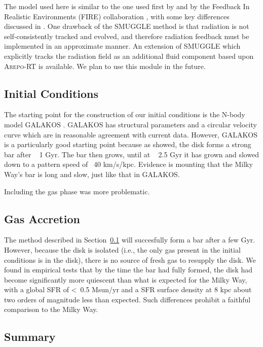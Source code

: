 \documentclass[a4paper,fleqn,usenatbib]{mnras}
\newcommand{\areport}{\textsc{Arepo-RT}}
\newcommand{\smuggle}{\textsc{SMUGGLE}}
\begin{document}
The model used here is similar to the one used first by
\citet{2011MNRAS.410.1391A, 2013ApJ...770...25A} and by the Feedback In
Realistic Environments (FIRE) collaboration \citep{2011MNRAS.417..950H,
2014MNRAS.445..581H, 2018MNRAS.480..800H}, with some key differences discussed
in \citet{2019MNRAS.489.4233M}. One drawback of the \smuggle{} method is that
radiation is not self-consistently tracked and evolved, and therefore
radiation feedback must be implemented in an approximate manner. An extension
of \smuggle{} which explicitly tracks the radiation field as an additional
fluid component \citep{2019arXiv191014041K} based upon \areport{}
\citep{2019MNRAS.485..117K} is available. We plan to use this module in the
future.

\subsection{Initial Conditions}\label{ssec:ics}
The starting point for the construction of our initial conditions is the
N-body model GALAKOS \citep{2020ApJ...890..117D}. GALAKOS has structural
parameters and a circular velocity curve which are in reasonable agreement
with current data. However, GALAKOS is a particularly good starting point
because as \citet{2020ApJ...890..117D} showed, the disk forms a strong bar
after ~ 1 Gyr. The bar then grows, until at ~ 2.5 Gyr it has grown and slowed
down to a pattern speed of ~40 km/s/kpc. Evidence is mounting that the Milky
Way's bar is long and slow, just like that in GALAKOS.

Including the gas phase was more problematic. 

\subsection{Gas Accretion}\label{ssec:gas_acc}
The method described in Section~\ref{ssec:ics} will succesfully form a bar
after a few Gyr. However, because the disk is isolated (i.e., the only gas
present in the initial conditions is in the disk), there is no source of fresh
gas to resupply the disk. We found in empirical tests that by the time the bar
had fully formed, the disk had become significantly more quiescent than what
is expected for the Milky Way, with a global SFR of <~0.5 Msun/yr and a SFR
surface density at 8 kpc about two orders of magnitude less than expected.
Such differences prohibit a faithful comparison to the Milky Way.

\subsection{Summary}\label{ssec:ics_summary}
\end{document}
